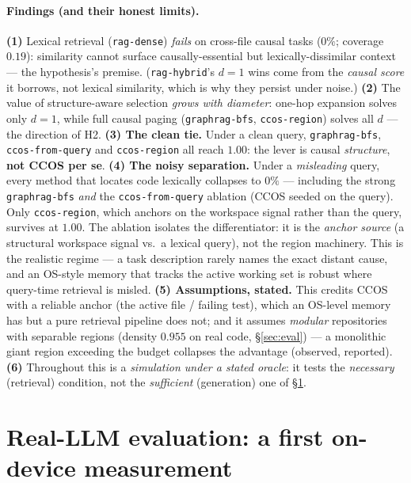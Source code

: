 \documentclass[11pt]{article}
\newcommand{\code}[1]{\texttt{#1}}
\begin{document}
\paragraph{Findings (and their honest limits).}
\textbf{(1)} Lexical retrieval (\code{rag-dense}) \emph{fails} on cross-file
causal tasks ($0\%$; coverage $0.19$): similarity cannot surface
causally-essential but lexically-dissimilar context --- the hypothesis's premise.
(\code{rag-hybrid}'s $d{=}1$ wins come from the \emph{causal score} it borrows,
not lexical similarity, which is why they persist under noise.)
\textbf{(2)} The value of structure-aware selection \emph{grows with diameter}:
one-hop expansion solves only $d{=}1$, while full causal paging
(\code{graphrag-bfs}, \code{ccos-region}) solves all $d$ --- the direction of H2.
\textbf{(3) The clean tie.} Under a clean query, \code{graphrag-bfs},
\code{ccos-from-query} and \code{ccos-region} all reach $1.00$: the lever is
causal \emph{structure}, \textbf{not CCOS per se}.
\textbf{(4) The noisy separation.} Under a \emph{misleading} query, every method
that locates code lexically collapses to $0\%$ --- including the strong
\code{graphrag-bfs} \emph{and} the \code{ccos-from-query} ablation (CCOS seeded on
the query). Only \code{ccos-region}, which anchors on the workspace signal rather
than the query, survives at $1.00$. The ablation isolates the differentiator: it
is the \emph{anchor source} (a structural workspace signal vs.\ a lexical query),
not the region machinery. This is the realistic regime --- a task description
rarely names the exact distant cause, and an OS-style memory that tracks the
active working set is robust where query-time retrieval is misled.
\textbf{(5) Assumptions, stated.} This credits CCOS with a reliable anchor (the
active file / failing test), which an OS-level memory has but a pure retrieval
pipeline does not; and it assumes \emph{modular} repositories with separable
regions (density $0.955$ on real code, \S\ref{sec:eval}) --- a monolithic giant
region exceeding the budget collapses the advantage (observed, reported).
\textbf{(6)} Throughout this is a \emph{simulation under a stated oracle}: it
tests the \emph{necessary} (retrieval) condition, not the \emph{sufficient}
(generation) one of \S\ref{sec:protocol}.

\section{Real-LLM evaluation: a first on-device measurement}\label{sec:protocol}
\end{document}
